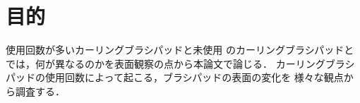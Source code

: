\documentclass[main]{subfiles}
\begin{document}
\section{目的}

使用回数が多いカーリングブラシパッドと未使用
のカーリングブラシパッドとでは，何が異なるのかを表面観察の点から本論文で論じる． 
カーリングブラシパッドの使用回数によって起こる，ブラシパッドの表面の変化を
様々な観点から調査する．
\end{document}

